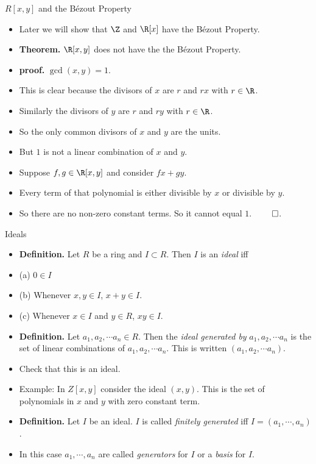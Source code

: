 \documentclass{beamer}
\begin{document}
\begin{frame}{$R[x,y]$ and the B\'{e}zout Property}

\begin{itemize}
  \item Later we will show that $\Z$ and $\R[x]$ have the B\'{e}zout Property.
  \item \textbf{Theorem.} $\R[x,y]$ does not have the the B\'{e}zout Property.
  \item \textbf{proof.} $\gcd(x,y) = 1$.
  \item This is clear because the divisors of $x$ are $r$ and $rx$ with $r\in\R$.
  \item Similarly the divisors of $y$ are $r$ and $ry$ with $r\in\R$.
  \item So the only common divisors of $x$ and $y$ are the units.
  \item But $1$ is not a linear combination of $x$ and $y$.
  \item Suppose $f,g\in\R[x,y]$ and consider $fx + gy$.
  \item Every term of that polynomial is either divisible by $x$ or divisible by $y$.
  \item So there are no non-zero constant terms. So it cannot equal $1$. $\qed$.
\end{itemize}

\end{frame}



\begin{frame}{Ideals}

\begin{itemize}
  \item \textbf{Definition.} Let $R$ be a ring and $I\subset R$. Then $I$ is an \emph{ideal} iff
  \item (a) $0\in I$
  \item (b) Whenever $x,y\in I$, $x+y\in I$.
  \item (c) Whenever $x\in I$ and $y\in R$, $xy\in I$.
  \item \textbf{Definition.} Let $a_1,a_2,\cdots a_n \in R$. Then the \emph{ideal generated by} $a_1,a_2,\cdots a_n$ is the set
  of linear combinations of $a_1,a_2,\cdots a_n$. This is written $(a_1,a_2, \cdots a_n)$.
  \item Check that this is an ideal.
  \item Example: In $Z[x,y]$ consider the ideal $(x,y)$. This is the set of polynomials in $x$ and $y$ with zero constant term.
  \item \textbf{Definition.} Let $I$ be an ideal. $I$ is called \emph{finitely generated} iff $I=(a_1,\cdots, a_n)$.
  \item In this
  case $a_1,\cdots, a_n$ are called \emph{generators} for $I$ or a \emph{basis} for $I$.
\end{itemize}

\end{frame}
\end{document}
